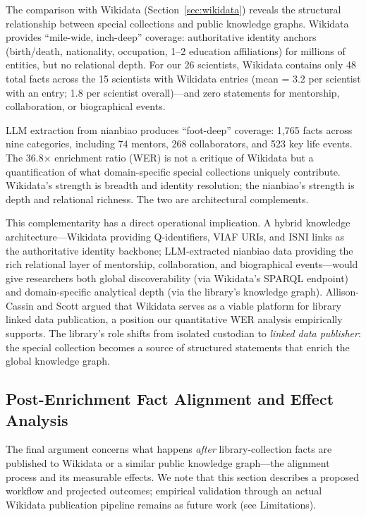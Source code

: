 \documentclass[review]{elsarticle}
\begin{document}
The comparison with Wikidata (Section~\ref{sec:wikidata}) reveals the structural relationship between special collections and public knowledge graphs. Wikidata provides ``mile-wide, inch-deep'' coverage: authoritative identity anchors (birth/death, nationality, occupation, 1--2 education affiliations) for millions of entities, but no relational depth. For our 26 scientists, Wikidata contains only 48 total facts across the 15 scientists with Wikidata entries (mean = 3.2 per scientist with an entry; 1.8 per scientist overall)—and zero statements for mentorship, collaboration, or biographical events.

LLM extraction from nianbiao produces ``foot-deep'' coverage: 1,765 facts across nine categories, including 74 mentors, 268 collaborators, and 523 key life events. The 36.8$\times$ enrichment ratio (WER) is not a critique of Wikidata but a quantification of what domain-specific special collections uniquely contribute. Wikidata's strength is breadth and identity resolution; the nianbiao's strength is depth and relational richness. The two are architectural complements.

This complementarity has a direct operational implication. A hybrid knowledge architecture—Wikidata providing Q-identifiers, VIAF URIs, and ISNI links as the authoritative identity backbone; LLM-extracted nianbiao data providing the rich relational layer of mentorship, collaboration, and biographical events—would give researchers both global discoverability (via Wikidata's SPARQL endpoint) and domain-specific analytical depth (via the library's knowledge graph). Allison-Cassin and Scott \cite{allisoncassin2018wikidata} argued that Wikidata serves as a viable platform for library linked data publication, a position our quantitative WER analysis empirically supports. The library's role shifts from isolated custodian to \textit{linked data publisher}: the special collection becomes a source of structured statements that enrich the global knowledge graph.

\subsection{Post-Enrichment Fact Alignment and Effect Analysis}

The final argument concerns what happens \textit{after} library-collection facts are published to Wikidata or a similar public knowledge graph—the alignment process and its measurable effects. We note that this section describes a proposed workflow and projected outcomes; empirical validation through an actual Wikidata publication pipeline remains as future work (see Limitations).
\end{document}
